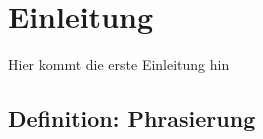 \chapter{Einleitung}
\label{chap:Einleitung}





\vspace{1cm}


Hier kommt die erste Einleitung hin

\section{Definition: Phrasierung}

